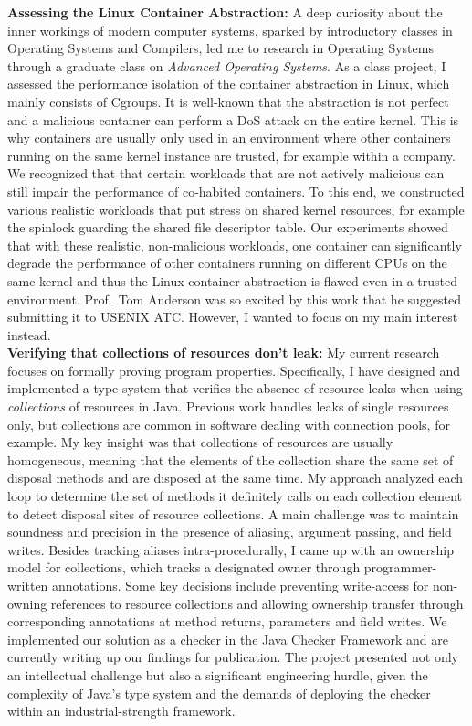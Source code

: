 \documentclass{article}
\begin{document}
\textbf{Assessing the Linux Container Abstraction:}
A deep curiosity about the inner workings of modern
computer systems, sparked by introductory classes in Operating Systems and Compilers, led me to research in Operating Systems through a graduate class on \emph{Advanced Operating Systems}. As a class project, I assessed the performance isolation of the container abstraction in Linux, which mainly consists of Cgroups. It is well-known that the abstraction is not perfect and a malicious container can perform a DoS attack on the entire kernel.
This is why containers are usually only used in an environment where other containers running on the same kernel instance are trusted, for example within a company. We recognized that that certain workloads that are not actively malicious can still impair the performance of co-habited containers. To this end, we constructed various realistic workloads that put stress on shared kernel resources, for example the spinlock guarding the shared file descriptor table. Our experiments showed that with these realistic, non-malicious workloads, one container can significantly degrade the performance of other containers running on different CPUs on the same kernel and thus the Linux container abstraction is flawed even in a trusted environment.
Prof.\ Tom Anderson was so excited by this work that he suggested submitting it to USENIX ATC. However, I wanted to focus on my main interest instead.\\

\textbf{Verifying that collections of resources don't leak:} My current research focuses on formally proving program properties. Specifically, I have designed and implemented a type system that verifies the absence of resource leaks when using \emph{collections} of resources in Java.
Previous work handles leaks of single resources only, but collections are common in software dealing with connection pools, for example.
My key insight was that collections of resources are usually homogeneous, meaning that the elements of the collection share the same set of disposal methods and are disposed at the same time. My approach analyzed each loop to determine the set of methods it definitely calls on each collection element to detect disposal sites of resource collections.
A main challenge was to maintain soundness and precision in the presence of aliasing, argument passing, and field writes. Besides tracking aliases intra-procedurally, I came up with an ownership model for collections, which tracks a designated owner through programmer-written annotations. Some key decisions include preventing write-access for non-owning references to resource collections and allowing ownership transfer through corresponding annotations at method returns, parameters and field writes.
We implemented our solution as a checker in the Java Checker Framework and are currently writing up our findings for publication. The project presented not only an intellectual challenge but also a significant engineering hurdle, given the complexity of Java's type system and the demands of deploying the checker within an industrial-strength framework.\\
\end{document}
